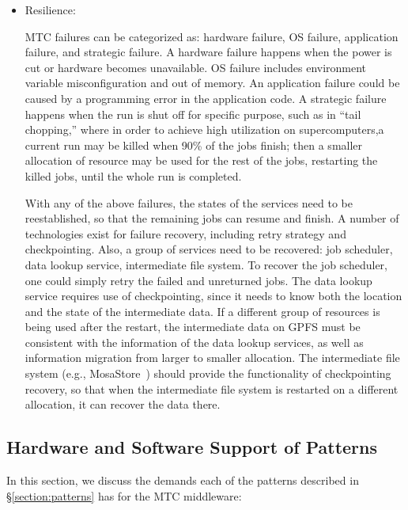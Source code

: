 \documentclass[10pt,letterpaper]{article}
\begin{document}
\begin{itemize}
\begin{itemize}
    \end{itemize}
    
  \item Resilience:

    MTC failures can be categorized as: hardware failure, OS failure, application failure, and strategic failure. A hardware failure happens when the power is cut or hardware becomes unavailable. OS failure includes environment variable misconfiguration and out of memory. An application failure could be caused by a programming error in the application code. A strategic failure happens when the run is shut off for specific purpose, such as in ``tail chopping,'' where in order to achieve high utilization on supercomputers,a current run may be killed when 90\% of the jobs finish; then a smaller allocation of resource may be used for the rest of the jobs, restarting the killed jobs, until the whole run is completed.

    With any of the above failures, the states of the services need to be reestablished, so that the remaining jobs can resume and finish. A number of technologies exist for failure recovery, including  retry strategy and checkpointing.
Also, a group of services need to be recovered: job scheduler, data lookup service, intermediate file system. To recover the job scheduler, one could simply retry the failed and unreturned jobs. The data lookup service requires use of checkpointing, since it needs to know  both the location and the state of the intermediate data. If a different group of resources is being used after the restart,
the intermediate data on GPFS must be consistent with the information of the data lookup services, as well as information migration from larger to smaller allocation. The intermediate file system (e.g.,  MosaStore~\cite{mosastore}) should provide the functionality of checkpointing recovery, so that when  the intermediate file system is restarted on a different allocation, it can recover the data there.


\end{itemize}


\subsection{Hardware and Software Support of Patterns\label{sect:patternsupport}}
In this section, we discuss the demands each of the patterns described
in \S\ref{section:patterns} has for the MTC middleware:
\end{document}
